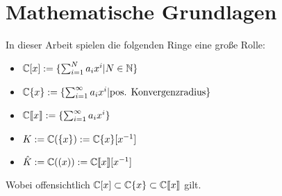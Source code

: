 \chapter{Mathematische Grundlagen}

\begin{comment}
Hier werde ich mich auf \cite{sabbah_cimpa90} und \cite{coutinho1995primer}
beziehen.
\end{comment}


In dieser Arbeit spielen die folgenden Ringe eine große Rolle:
\begin{itemize}
\item $\mathbb{C}[x]:=\{ \sum^{N}_{i=1}a_ix^i | N\in \mathbb{N} \}$
\item $\mathbb{C}\{x\}:=\{ \sum^{\infty}_{i=1}a_ix^i | \mbox{pos.
  Konvergenzradius} \}$
\item $\mathbb{C}\llbracket x\rrbracket:=\{ \sum^{\infty}_{i=1}a_ix^i \}$
\item $K:=\mathbb{C}(\{x\}):=\mathbb{C}\{x\}[x^{-1}]$
\item $\hat{K}:=\mathbb{C}((x)):=\mathbb{C}\llbracket x\rrbracket[x^{-1}]$
\end{itemize}
Wobei offensichtlich $\mathbb{C}[x]\subset\mathbb{C}\{x\}\subset{\mathbb C\llbracket x\rrbracket}$  gilt.

\begin{comment}
Es bezeichnet der Hut ($ \, \hat \,\, $) das jeweils formale äquivalent zu
einem konvergentem Objekt.
\end{comment}

\begin{comment}
\begin{lem}[Seite 2]
ein paar eigenschaften
\begin{enumerate}
\item $\C[x]$ ist ein graduierter Ring, durch die Grad der
Polynome. Diese graduierung induziert eine aufsteigende Filtrierung.

alle Ideale haben die form $(x-a)$ mit $a\in \C$
\item wenn $\mathfrak{m}$ das maximale Ideal von $\C[x]$ (erzeugt von
$x$ ist), so ist
\[
  \C[[x]]=
  \underset{k}{\underleftarrow{\lim}} \C[X]\backslash\mathfrak{m}^k
\]
The ring $\C[[x]]$ ist ein nöterscher lokaler Ring:
jede Potenzreihe mit konstantem term $\neq 0$ ist invertierbar.

Der ring ist ebenfalls ein diskreter ??? Ring (discrete valuation
ring)

Die Filtrierung nach grad des Maximalen Ideals, genannt
$\mathfrak{m}$-adische Fitration, ist die Filtrierung
$\mathfrak{m}^k=\{f\in \C[[x]]|v(f)\geq k\}$

und es gilt $gr_\mathfrak{m}(\C[[x]])=\C[x]$
\end{enumerate}
\end{lem}
\end{comment}

